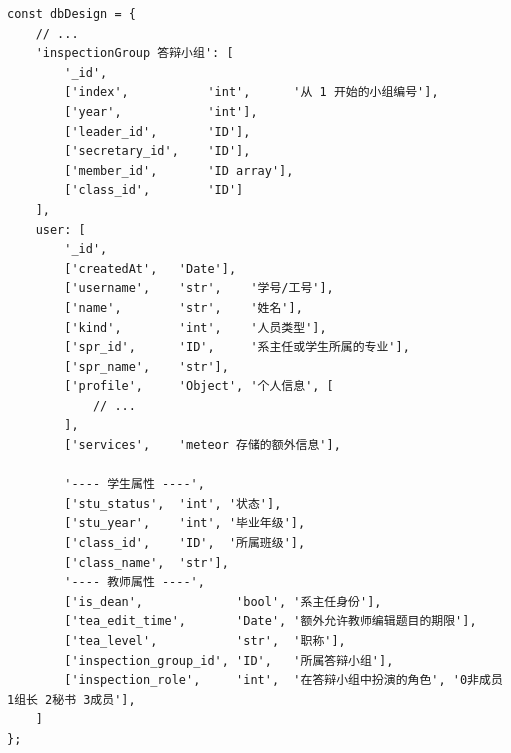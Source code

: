\begin{lstlisting}[title=代码 2-1：数据库设计]
const dbDesign = {
	// ...
	'inspectionGroup 答辩小组': [
		'_id',
		['index',           'int',      '从 1 开始的小组编号'],
		['year',            'int'],
		['leader_id',       'ID'],
		['secretary_id',    'ID'],
		['member_id',       'ID array'],
		['class_id',        'ID']
	],
	user: [
		'_id',
		['createdAt',   'Date'],
		['username',    'str',    '学号/工号'],
		['name',        'str',    '姓名'],
		['kind',        'int',    '人员类型'],
		['spr_id',      'ID',     '系主任或学生所属的专业'],
		['spr_name',    'str'],
		['profile',     'Object', '个人信息', [
			// ...
		],
		['services',    'meteor 存储的额外信息'],
		
		'---- 学生属性 ----',
		['stu_status',  'int', '状态'],
		['stu_year',    'int', '毕业年级'],
		['class_id',    'ID',  '所属班级'],
		['class_name',  'str'],
		'---- 教师属性 ----',
		['is_dean',             'bool', '系主任身份'],
		['tea_edit_time',       'Date', '额外允许教师编辑题目的期限'],
		['tea_level',           'str',  '职称'],
		['inspection_group_id', 'ID',   '所属答辩小组'],
		['inspection_role',     'int',  '在答辩小组中扮演的角色', '0非成员 1组长 2秘书 3成员'],
	]
};
\end{lstlisting}

